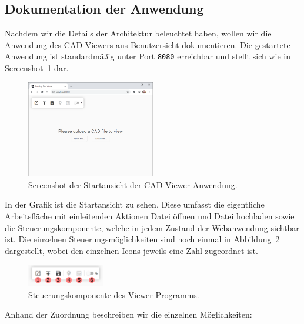 \subsection{Dokumentation der Anwendung}
\label{subsec:documentation}

Nachdem wir die Details der Architektur beleuchtet haben, wollen wir die Anwendung des CAD-Viewers aus Benutzersicht dokumentieren.
Die gestartete Anwendung ist standardmäßig unter Port \texttt{8080} erreichbar und stellt sich wie in Screenshot~\ref{fig:app-screenshot} dar.

\begin{figure}[h]
    \includegraphics[width=0.5\textwidth]{res/app-screenshot.png}
    \caption{Screenshot der Startansicht der CAD-Viewer Anwendung.}
    \label{fig:app-screenshot}
\end{figure}

In der Grafik ist die Startansicht zu sehen.
Diese umfasst die eigentliche Arbeitsfläche mit einleitenden Aktionen \glqq{}Datei öffnen\grqq{} und \glqq{}Datei hochladen\grqq{} sowie die Steuerungskomponente, welche in jedem Zustand der Webanwendung sichtbar ist.
Die einzelnen Steuerungsmöglichkeiten sind noch einmal in Abbildung~\ref{fig:controls-component} dargestellt, wobei den einzelnen Icons jeweils eine Zahl zugeordnet ist.

\begin{figure}
    \centering
    \includegraphics[width=0.3\textwidth]{res/controls.pdf}
    \caption{Steuerungskomponente des Viewer-Programms.}
    \label{fig:controls-component}
\end{figure}

Anhand der Zuordnung beschreiben wir die einzelnen Möglichkeiten:

